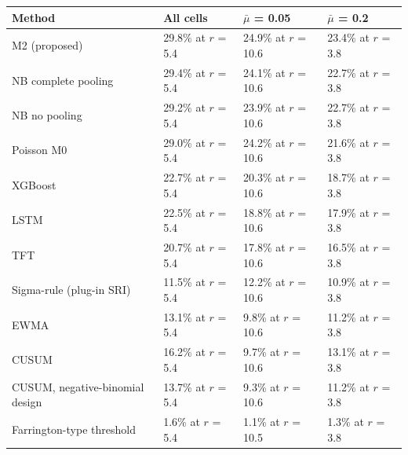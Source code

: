 \documentclass[10pt,a4paper]{article}
\begin{document}
\vspace{6pt}
\noindent\begin{minipage}{\linewidth}
\centering\footnotesize
\begin{tabular}{llll}
\toprule
Method & All cells & $\bar{\mu}$ = 0.05 & $\bar{\mu}$ = 0.2 \\ \midrule
M2 (proposed) & 29.8\% at $r$ = 5.4 & 24.9\% at $r$ = 10.6 & 23.4\% at $r$ = 3.8 \\
NB complete pooling & 29.4\% at $r$ = 5.4 & 24.1\% at $r$ = 10.6 & 22.7\% at $r$ = 3.8 \\
NB no pooling & 29.2\% at $r$ = 5.4 & 23.9\% at $r$ = 10.6 & 22.7\% at $r$ = 3.8 \\
Poisson M0 & 29.0\% at $r$ = 5.4 & 24.2\% at $r$ = 10.6 & 21.6\% at $r$ = 3.8 \\
XGBoost & 22.7\% at $r$ = 5.4 & 20.3\% at $r$ = 10.6 & 18.7\% at $r$ = 3.8 \\
LSTM & 22.5\% at $r$ = 5.4 & 18.8\% at $r$ = 10.6 & 17.9\% at $r$ = 3.8 \\
TFT & 20.7\% at $r$ = 5.4 & 17.8\% at $r$ = 10.6 & 16.5\% at $r$ = 3.8 \\
Sigma-rule (plug-in SRI) & 11.5\% at $r$ = 5.4 & 12.2\% at $r$ = 10.6 & 10.9\% at $r$ = 3.8 \\
EWMA & 13.1\% at $r$ = 5.4 & 9.8\% at $r$ = 10.6 & 11.2\% at $r$ = 3.8 \\
CUSUM & 16.2\% at $r$ = 5.4 & 9.7\% at $r$ = 10.6 & 13.1\% at $r$ = 3.8 \\
CUSUM, negative-binomial design & 13.7\% at $r$ = 5.4 & 9.3\% at $r$ = 10.6 & 11.2\% at $r$ = 3.8 \\
Farrington-type threshold & 1.6\% at $r$ = 5.4 & 1.1\% at $r$ = 10.5 & 1.3\% at $r$ = 3.8 \\
\bottomrule
\end{tabular}
\end{minipage}
\vspace{8pt}
\end{document}
